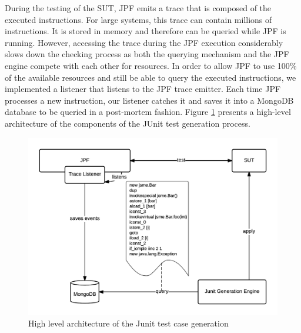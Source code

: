\documentclass[12pt]{report}
\begin{document}
During the testing of the SUT, JPF emits a trace that is composed of the
executed instructions. For large systems, this trace can contain
millions of instructions. It is stored in memory and therefore can be
queried while JPF is running. However, accessing the trace during the
JPF execution considerably slows down the checking process as both the
querying mechanism and the JPF engine compete with each other for
resources. In order to allow JPF to use 100\% of the available resources
and still be able to query the executed instructions, we implemented a
listener that listens to the JPF trace emitter. Each time JPF processes
a new instruction, our listener catches it and saves it into a MongoDB
database to be queried in a post-mortem fashion. Figure
\ref{fig:jcharming-unittest} presents a high-level architecture of the
components of the JUnit test generation process.

\begin{figure}
  \centering
    \includegraphics[scale=0.8]{media/chap8/unittest.png}
    \caption{High level architecture of the Junit test case generation
    \label{fig:jcharming-unittest}}
\end{figure}
\end{document}
